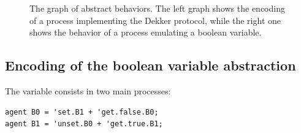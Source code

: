 \documentclass[10pt,a4paper]{article}
\begin{document}
    \begin{figure}[htbp]
        \centering

        \label{pic:Protocol}
        \caption{The graph of abstract behaviors. The left graph shows the
                 encoding of a process implementing the Dekker
                 protocol, while the right one shows the behavior of a
                 process emulating a boolean variable.}

    \end{figure}

    \subsection{Encoding of the boolean variable abstraction}
    \label{sub:EncodeBool}

        The variable consists in two main processes:

        \begin{verbatim}
agent B0 = 'set.B1 + 'get.false.B0;
agent B1 = 'unset.B0 + 'get.true.B1;
        \end{verbatim}
\end{document}
